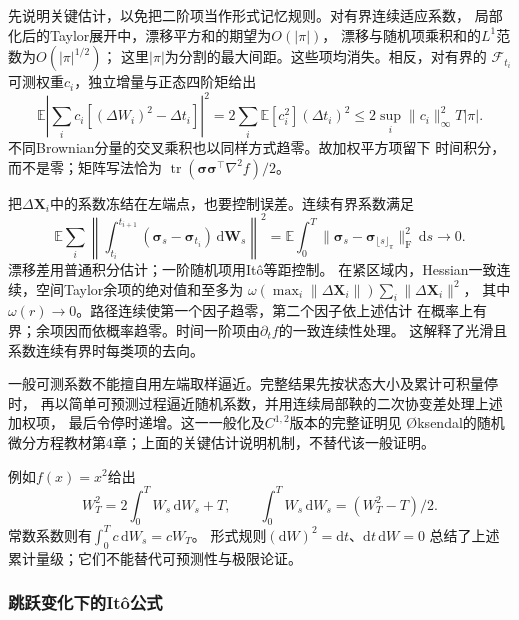 先说明关键估计，以免把二阶项当作形式记忆规则。对有界连续适应系数，
局部化后的Taylor展开中，漂移平方和的期望为$O(|\pi|)$，
漂移与随机项乘积和的$L^1$范数为$O(|\pi|^{1/2})$；
这里$|\pi|$为分割的最大间距。这些项均消失。相反，对有界的
$\mathcal F_{t_i}$可测权重$c_i$，独立增量与正态四阶矩给出
\[
 \mathbb E\left|\sum_i c_i[(\Delta W_i)^2-\Delta t_i]\right|^2
   =2\sum_i\mathbb E[c_i^2](\Delta t_i)^2
   \leq2\sup_i\|c_i\|_\infty^2T|\pi|.
\]
不同Brownian分量的交叉乘积也以同样方式趋零。故加权平方项留下
时间积分，而不是零；矩阵写法恰为
$\operatorname{tr}(\bm\sigma\bm\sigma^\top\nabla^2f)/2$。

把$\Delta\bm X_i$中的系数冻结在左端点，也要控制误差。连续有界系数满足
\[
 \mathbb E\sum_i
 \left\|\int_{t_i}^{t_{i+1}}
    (\bm\sigma_s-\bm\sigma_{t_i})\,\mathrm d\bm W_s\right\|^2
 =\mathbb E\int_0^T
       \|\bm\sigma_s-\bm\sigma_{\lfloor s\rfloor_\pi}\|_{\mathrm F}^2\,\mathrm ds
 \longrightarrow0.
\]
漂移差用普通积分估计；一阶随机项用Itô等距控制。
在紧区域内，Hessian一致连续，空间Taylor余项的绝对值和至多为
$\omega(\max_i\|\Delta\bm X_i\|)\sum_i\|\Delta\bm X_i\|^2$，
其中$\omega(r)\to0$。路径连续使第一个因子趋零，第二个因子依上述估计
在概率上有界；余项因而依概率趋零。时间一阶项由$\partial_t f$的一致连续性处理。
这解释了光滑且系数连续有界时每类项的去向。

一般可测系数不能擅自用左端取样逼近。完整结果先按状态大小及累计可积量停时，
再以简单可预测过程逼近随机系数，并用连续局部鞅的二次协变差处理上述加权项，
最后令停时递增。这一一般化及$C^{1,2}$版本的完整证明见
Øksendal的随机微分方程教材第4章；上面的关键估计说明机制，不替代该一般证明。

例如$f(x)=x^2$给出
\[
  W_T^2=2\int_0^T W_s\,\mathrm dW_s+T,\qquad
  \int_0^T W_s\,\mathrm dW_s=(W_T^2-T)/2.
\]
常数系数则有$\int_0^T c\,\mathrm dW_s=cW_T$。
形式规则$(\mathrm dW)^2=\mathrm dt$、$\mathrm dt\,\mathrm dW=0$
总结了上述累计量级；它们不能替代可预测性与极限论证。

\subsubsection{跳跃变化下的Itô公式}
\label{sec:action-state-jump-ito}

